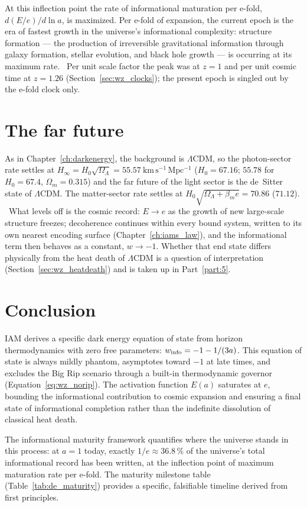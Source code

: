 At this inflection point the rate of informational maturation per e-fold, $d(E/e)/d\ln a$, is maximized. Per e-fold of expansion, the current
epoch is the era of fastest growth in the universe's informational complexity: structure formation --- the production of irreversible
gravitational information through galaxy formation, stellar evolution, and black hole growth --- is occurring at its maximum rate. \interp\ Per
unit scale factor the peak was at $z=1$ and per unit cosmic time at $z=1.26$ (Section~\ref{sec:wz_clocks}); the present epoch is singled out by
the e-fold clock only.

\section{The far future}\label{sec:wz_farfuture}
As in Chapter~\ref{ch:darkenergy}, the background is $\Lambda$CDM, so the photon-sector rate settles at
$H_\infty=H_0\sqrt{\Omega_\Lambda}=55.57~\mathrm{km\,s^{-1}\,Mpc^{-1}}$ ($H_0=67.16$; $55.78$ for $H_0=67.4$, $\Omega_m=0.315$) and the far future of the light
sector is the de~Sitter state of $\Lambda$CDM. The matter-sector rate settles at $H_0\sqrt{\Omega_\Lambda+\beta_me}=70.86$ ($71.12$).
\calc\ What levels off is the cosmic record: $E\to e$ as the growth of new large-scale structure freezes; decoherence continues within every bound system, written to its own nearest encoding surface (Chapter~\ref{ch:iams_law}), and the informational term then behaves as a
constant, $w\to-1$. Whether that end state differs physically from the heat death of $\Lambda$CDM is a question of interpretation
(Section~\ref{sec:wz_heatdeath}) and is taken up in Part~\ref{part:5}. \interp

\section{Conclusion}
IAM derives a specific dark energy equation of state from horizon thermodynamics with zero free parameters: $w_{\rm info}=-1-1/(3a)$. This
equation of state is always mildly phantom, asymptotes toward $-1$ at late times, and excludes the Big Rip scenario through a built-in
thermodynamic governor (Equation~\eqref{eq:wz_norip}). The activation function $E(a)$ saturates at $e$, bounding the informational contribution to
cosmic expansion and ensuring a final state of informational completion rather than the indefinite dissolution of classical heat death. \interp

The informational maturity framework quantifies where the universe stands in this process: at $a=1$ today, exactly $1/e\approx36.8\,\%$ of the
universe's total informational record has been written, at the inflection point of maximum maturation rate per e-fold. The maturity milestone
table (Table~\ref{tab:de_maturity}) provides a specific, falsifiable timeline derived from first principles. \calc

